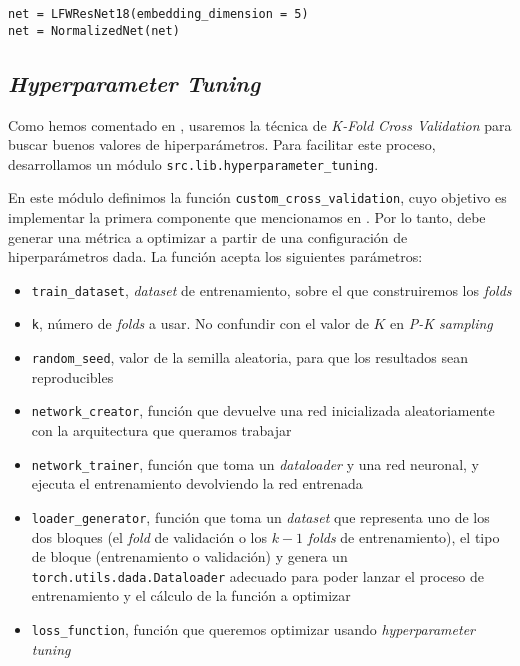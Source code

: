 \begin{lstlisting}[caption={Ejemplo de uso del patrón \textit{Decorator} para decidir si usamos o no normalización. El resto del código no tiene por qué saber este detalle de implementación, porque no cambiamos la interfaz de la clase}, captionpos=b]
net = LFWResNet18(embedding_dimension = 5)
net = NormalizedNet(net)
\end{lstlisting}

\subsection{\textit{Hyperparameter Tuning}} \label{isec:hp_tuning}

Como hemos comentado en , usaremos la técnica de \textit{K-Fold Cross Validation} para buscar buenos valores de hiperparámetros. Para facilitar este proceso, desarrollamos un módulo \lstinline{src.lib.hyperparameter_tuning}.

En este módulo definimos la función \lstinline{custom_cross_validation}, cuyo objetivo es implementar la primera componente que mencionamos en . Por lo tanto, debe generar una métrica a optimizar a partir de una configuración de hiperparámetros dada. La función acepta los siguientes parámetros:

\begin{itemize}
    \item \lstinline{train_dataset}, \textit{dataset} de entrenamiento, sobre el que construiremos los \textit{folds}
    \item \lstinline{k}, número de \textit{folds} a usar. No confundir con el valor de $K$ en \textit{P-K sampling}
    \item \lstinline{random_seed}, valor de la semilla aleatoria, para que los resultados sean reproducibles
    \item \lstinline{network_creator}, función que devuelve una red inicializada aleatoriamente con la arquitectura que queramos trabajar
    \item \lstinline{network_trainer}, función que toma un \textit{dataloader} y una red neuronal, y ejecuta el entrenamiento devolviendo la red entrenada
    \item \lstinline{loader_generator}, función que toma un \textit{dataset} que representa uno de los dos bloques (el \textit{fold} de validación o los $k-1$ \textit{folds} de entrenamiento), el tipo de bloque (entrenamiento o validación) y genera un \lstinline{torch.utils.dada.Dataloader} adecuado para poder lanzar el proceso de entrenamiento y el cálculo de la función a optimizar
    \item \lstinline{loss_function}, función que queremos optimizar usando \textit{hyperparameter tuning}
\end{itemize}

